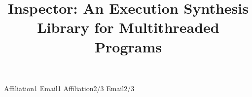 \documentclass{sigplanconf}
\begin{document}
\title{Inspector: An Execution Synthesis Library for Multithreaded Programs}

           {Affiliation1}
           {Email1}
           {Affiliation2/3}
           {Email2/3}
           


\maketitle















 
\end{document}
